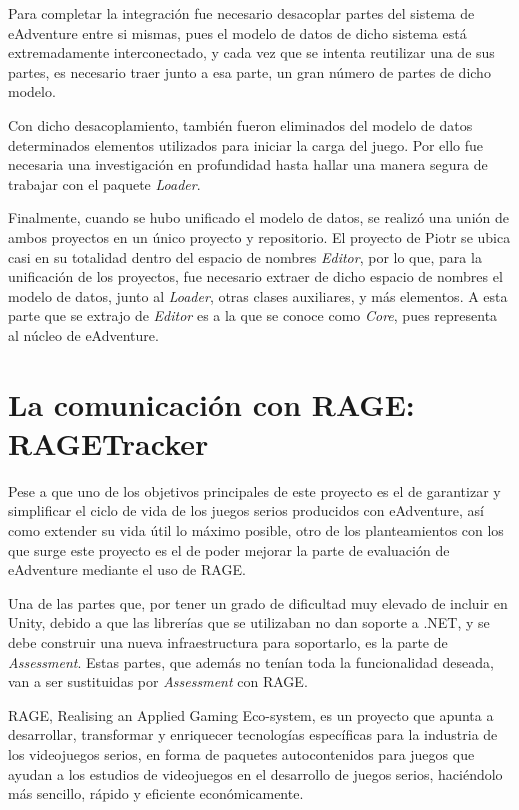Para completar la integración fue necesario desacoplar partes del sistema de eAdventure entre si mismas, pues el modelo de datos de dicho sistema está extremadamente interconectado, y cada vez que se intenta reutilizar una de sus partes, es necesario traer junto a esa parte, un gran número de partes de dicho modelo. 

Con dicho desacoplamiento, también fueron eliminados del modelo de datos determinados elementos utilizados para iniciar la carga del juego. Por ello fue necesaria una investigación en profundidad hasta hallar una manera segura de trabajar con el paquete \textit{Loader}.

Finalmente, cuando se hubo unificado el modelo de datos, se realizó una unión de ambos proyectos en un único proyecto y repositorio. El proyecto de Piotr se ubica casi en su totalidad dentro del espacio de nombres \textit{Editor}, por lo que, para la unificación de los proyectos, fue necesario extraer de dicho espacio de nombres el modelo de datos, junto al \textit{Loader}, otras clases auxiliares, y más elementos. A esta parte que se extrajo de \textit{Editor} es a la que se conoce como \textit{Core}, pues representa al núcleo de eAdventure.

\newpage

\section{La comunicación con RAGE: RAGETracker}

Pese a que uno de los objetivos principales de este proyecto es el de garantizar y simplificar el ciclo de vida de los juegos serios producidos con eAdventure, así como extender su vida útil lo máximo posible, otro de los planteamientos con los que surge este proyecto es el de poder mejorar la parte de evaluación de eAdventure mediante el uso de RAGE.

Una de las partes que, por tener un grado de dificultad muy elevado de incluir en Unity, debido a que las librerías que se utilizaban no dan soporte a .NET, y se debe construir una nueva infraestructura para soportarlo, es la parte de \textit{Assessment}. Estas partes, que además no tenían toda la funcionalidad deseada, van a ser sustituidas por \textit{Assessment} con RAGE.

RAGE, Realising an Applied Gaming Eco-system, es un proyecto que apunta a desarrollar, transformar y enriquecer tecnologías específicas para la industria de los videojuegos serios, en forma de paquetes autocontenidos para juegos que ayudan a los estudios de videojuegos en el desarrollo de juegos serios, haciéndolo más sencillo, rápido y eficiente económicamente.

